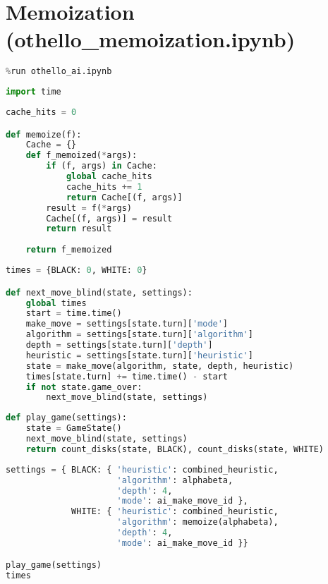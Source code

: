\hypertarget{memoization-othello_memoization.ipynb}{%
\section{Memoization
(othello\_memoization.ipynb)}\label{memoization-othello_memoization.ipynb}}

\begin{lstlisting}[language=Python]
%run othello_game.ipynb
%run othello_ai.ipynb
\end{lstlisting}

\begin{lstlisting}[language=Python]
import time
\end{lstlisting}

\begin{lstlisting}[language=Python]
cache_hits = 0

def memoize(f):
    Cache = {}
    def f_memoized(*args):
        if (f, args) in Cache:
            global cache_hits
            cache_hits += 1
            return Cache[(f, args)]
        result = f(*args)
        Cache[(f, args)] = result
        return result
    
    return f_memoized
\end{lstlisting}

\begin{lstlisting}[language=Python]
times = {BLACK: 0, WHITE: 0}

def next_move_blind(state, settings):
    global times
    start = time.time()
    make_move = settings[state.turn]['mode']
    algorithm = settings[state.turn]['algorithm']
    depth = settings[state.turn]['depth']
    heuristic = settings[state.turn]['heuristic']
    state = make_move(algorithm, state, depth, heuristic)
    times[state.turn] += time.time() - start
    if not state.game_over:
        next_move_blind(state, settings)
\end{lstlisting}

\begin{lstlisting}[language=Python]
def play_game(settings):
    state = GameState()
    next_move_blind(state, settings)
    return count_disks(state, BLACK), count_disks(state, WHITE)
\end{lstlisting}

\begin{lstlisting}[language=Python]
settings = { BLACK: { 'heuristic': combined_heuristic,
                      'algorithm': alphabeta,
                      'depth': 4,
                      'mode': ai_make_move_id },
             WHITE: { 'heuristic': combined_heuristic,
                      'algorithm': memoize(alphabeta),
                      'depth': 4,
                      'mode': ai_make_move_id }}

play_game(settings)
times
\end{lstlisting}

